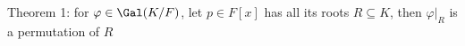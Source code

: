 \documentclass[preview]{standalone}
\begin{document}
\begin{center}
Theorem 1: for $\varphi \in \Gal(K/F)$, let $p \in F[x]$ has all its roots $R \subseteq K$, then $\varphi|_R$ is a permutation of $R$
\end{center}
\end{document}
